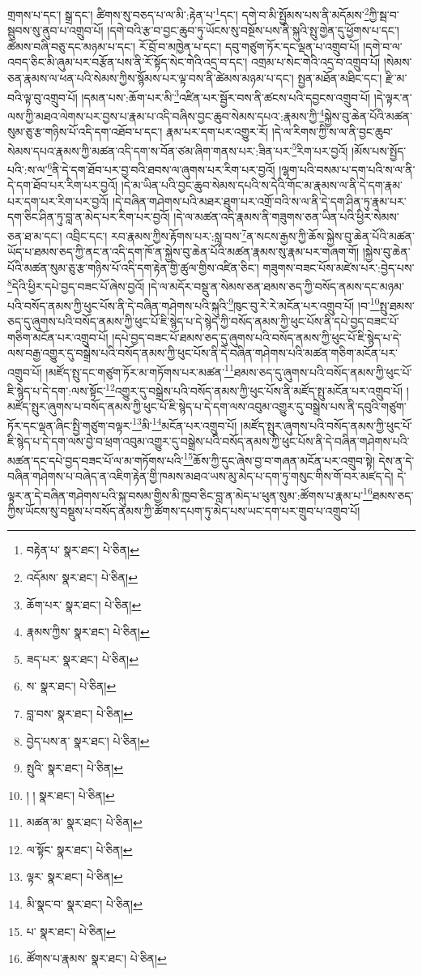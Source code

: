 གྲགས་པ་དང་། སྒྲ་དང་། ཚིགས་སུ་བཅད་པ་ལ་མི་:རྟེན་པ་\footnote{བརྟེན་པ་  སྣར་ཐང་།  པེ་ཅིན། }དང་། དགེ་བ་མི་སྤྱོམས་པས་ནི་མདོམས་\footnote{འདོམས་  སྣར་ཐང་།  པེ་ཅིན། }ཀྱི་སྦ་བ་སྦུབས་སུ་ནུབ་པ་འགྲུབ་པོ། །དགེ་བའི་རྩ་བ་བྱང་ཆུབ་ཏུ་ཡོངས་སུ་བསྔོས་པས་ནི་སྐུའི་སྤུ་གྱེན་དུ་ཕྱོགས་པ་དང་། ཚེམས་བཞི་བཅུ་དང་མཉམ་པ་དང་། རོ་བྲོ་བ་མཁྱེན་པ་དང་། དབུ་གཙུག་ཏོར་དང་ལྡན་པ་འགྲུབ་པོ། །དགེ་བ་ལ་འབད་ཅིང་མི་ཞུམ་པར་བརྩོན་པས་ནི་རོ་སྟོད་སེང་གེའི་འདྲ་བ་དང་། འགྲམ་པ་སེང་གེའི་འདྲ་བ་འགྲུབ་པོ། །སེམས་ཅན་རྣམས་ལ་ཕན་པའི་སེམས་ཀྱིས་སྙོམས་པར་ལྟ་བས་ནི་ཚེམས་མཉམ་པ་དང་། སྤྱན་མཐོན་མཐིང་དང་། རྫི་མ་བའི་ལྟ་བུ་འགྲུབ་པོ། །དམན་པས་:ཆོག་པར་མི་\footnote{ཆོག་པར་  སྣར་ཐང་།  པེ་ཅིན། }འཛིན་པར་སྦྱོར་བས་ནི་ཚངས་པའི་དབྱངས་འགྲུབ་པོ། །དེ་ལྟར་ན་ལས་ཀྱི་མཐའ་ལེགས་པར་བྱས་པ་རྣམ་པ་འདི་བཞིས་བྱང་ཆུབ་སེམས་དཔའ་:རྣམས་ཀྱི་\footnote{རྣམས་ཀྱིས་  སྣར་ཐང་།  པེ་ཅིན། }སྐྱེས་བུ་ཆེན་པོའི་མཚན་སུམ་ཅུ་རྩ་གཉིས་པོ་འདི་དག་འཐོབ་པ་དང་། རྣམ་པར་དག་པར་འགྱུར་རོ། །དེ་ལ་རིགས་ཀྱི་ས་ལ་ནི་བྱང་ཆུབ་སེམས་དཔའ་རྣམས་ཀྱི་མཚན་འདི་དག་ས་བོན་ཙམ་ཞིག་གནས་པར་:ཟིན་པར་\footnote{ཟད་པར་  སྣར་ཐང་།  པེ་ཅིན། }རིག་པར་བྱའོ། །མོས་པས་སྤྱོད་པའི་:ས་ལ་\footnote{ས་  སྣར་ཐང་།  པེ་ཅིན། }ནི་དེ་དག་ཐོབ་པར་བྱ་བའི་ཐབས་ལ་ཞུགས་པར་རིག་པར་བྱའོ། །ལྷག་པའི་བསམ་པ་དག་པའི་ས་ལ་ནི་དེ་དག་ཐོབ་པར་རིག་པར་བྱའོ། །དེ་མ་ཡིན་པའི་བྱང་ཆུབ་སེམས་དཔའི་ས་དེའི་གོང་མ་རྣམས་ལ་ནི་དེ་དག་རྣམ་པར་དག་པར་རིག་པར་བྱའོ། །དེ་བཞིན་གཤེགས་པའི་མཐར་ཐུག་པར་འགྲོ་བའི་ས་ལ་ནི་དེ་དག་ཤིན་ཏུ་རྣམ་པར་དག་ཅིང་ཤིན་ཏུ་བླ་ན་མེད་པར་རིག་པར་བྱའོ། །དེ་ལ་མཚན་འདི་རྣམས་ནི་གཟུགས་ཅན་ཡིན་པའི་ཕྱིར་སེམས་ཅན་ཐ་མ་དང་། འབྲིང་དང་། རབ་རྣམས་ཀྱིས་རྟོགས་པར་:སླ་བས་\footnote{བླ་བས་  སྣར་ཐང་།  པེ་ཅིན། }ན་སངས་རྒྱས་ཀྱི་ཆོས་སྐྱེས་བུ་ཆེན་པོའི་མཚན་ཡོད་པ་ཐམས་ཅད་ཀྱི་ནང་ན་འདི་དག་ཁོ་ན་སྐྱེས་བུ་ཆེན་པོའི་མཚན་རྣམས་སུ་རྣམ་པར་གཞག་གོ། །སྐྱེས་བུ་ཆེན་པོའི་མཚན་སུམ་ཅུ་རྩ་གཉིས་པོ་འདི་དག་རྟེན་གྱི་ཚུལ་གྱིས་འཛིན་ཅིང་། གཟུགས་བཟང་པོས་མཛེས་པར་:བྱེད་པས་\footnote{བྱེད་པས་ན་  སྣར་ཐང་།  པེ་ཅིན། }དེའི་ཕྱིར་དཔེ་བྱད་བཟང་པོ་ཞེས་བྱའོ། །དེ་ལ་མདོར་བསྡུ་ན་སེམས་ཅན་ཐམས་ཅད་ཀྱི་བསོད་ནམས་དང་མཉམ་པའི་བསོད་ནམས་ཀྱི་ཕུང་པོས་ནི་དེ་བཞིན་གཤེགས་པའི་སྐུའི་\footnote{སྤུའི་  སྣར་ཐང་།  པེ་ཅིན། }ཁུང་བུ་རེ་རེ་མངོན་པར་འགྲུབ་པོ། །བ་\footnote{། །  སྣར་ཐང་།  པེ་ཅིན། }སྤུ་ཐམས་ཅད་དུ་ཞུགས་པའི་བསོད་ནམས་ཀྱི་ཕུང་པོ་ཇི་སྙེད་པ་དེ་སྙེད་ཀྱི་བསོད་ནམས་ཀྱི་ཕུང་པོས་ནི་དཔེ་བྱད་བཟང་པོ་གཅིག་མངོན་པར་འགྲུབ་པོ། །དཔེ་བྱད་བཟང་པོ་ཐམས་ཅད་དུ་ཞུགས་པའི་བསོད་ནམས་ཀྱི་ཕུང་པོ་ཇི་སྙེད་པ་དེ་ལས་བརྒྱ་འགྱུར་དུ་བསྒྲེས་པའི་བསོད་ནམས་ཀྱི་ཕུང་པོས་ནི་དེ་བཞིན་གཤེགས་པའི་མཚན་གཅིག་མངོན་པར་འགྲུབ་པོ། །མཛོད་སྤུ་དང་གཙུག་ཏོར་མ་གཏོགས་པར་མཚན་\footnote{མཚན་མ་  སྣར་ཐང་།  པེ་ཅིན། }ཐམས་ཅད་དུ་ཞུགས་པའི་བསོད་ནམས་ཀྱི་ཕུང་པོ་ཇི་སྙེད་པ་དེ་དག་:ལས་སྟོང་\footnote{ལ་སྟོང་  སྣར་ཐང་།  པེ་ཅིན། }འགྱུར་དུ་བསྒྲེས་པའི་བསོད་ནམས་ཀྱི་ཕུང་པོས་ནི་མཛོད་སྤུ་མངོན་པར་འགྲུབ་པོ། །མཛོད་སྤུར་ཞུགས་པ་བསོད་ནམས་ཀྱི་ཕུང་པོ་ཇི་སྙེད་པ་དེ་དག་ལས་འབུམ་འགྱུར་དུ་བསྒྲེས་པས་ནི་དབུའི་གཙུག་ཏོར་དང་ལྡན་ཞིང་སྤྱི་གཙུག་བལྟར་\footnote{ལྟར་  སྣར་ཐང་།  པེ་ཅིན། }མི་\footnote{མི་སྣང་བ་  སྣར་ཐང་།  པེ་ཅིན། }མངོན་པར་འགྲུབ་པོ། །མཛོད་སྤུར་ཞུགས་པའི་བསོད་ནམས་ཀྱི་ཕུང་པོ་ཇི་སྙེད་པ་དེ་དག་ལས་བྱེ་བ་ཕྲག་འབུམ་འགྱུར་དུ་བསྒྲེས་པའི་བསོད་ནམས་ཀྱི་ཕུང་པོས་ནི་དེ་བཞིན་གཤེགས་པའི་མཚན་དང་དཔེ་བྱད་བཟང་པོ་ལ་མ་གཏོགས་པའི་\footnote{པ་  སྣར་ཐང་།  པེ་ཅིན། }ཆོས་ཀྱི་དུང་ཞེས་བྱ་བ་གཞན་མངོན་པར་འགྲུབ་སྟེ། དེས་ན་དེ་བཞིན་གཤེགས་པ་བཞེད་ན་འཇིག་རྟེན་གྱི་ཁམས་མཐའ་ཡས་མུ་མེད་པ་དག་ཏུ་གསུང་གིས་གོ་བར་མཛད་དེ། དེ་ལྟར་ན་དེ་བཞིན་གཤེགས་པའི་སྐུ་བསམ་གྱིས་མི་ཁྱབ་ཅིང་བླ་ན་མེད་པ་ཕུན་སུམ་:ཚོགས་པ་རྣམ་པ་\footnote{ཚོགས་པ་རྣམས་  སྣར་ཐང་།  པེ་ཅིན། }ཐམས་ཅད་ཀྱིས་ཡོངས་སུ་བསྡུས་པ་བསོད་ནམས་ཀྱི་ཚོགས་དཔག་ཏུ་མེད་པས་ཡང་དག་པར་གྲུབ་པ་འགྲུབ་པོ། 